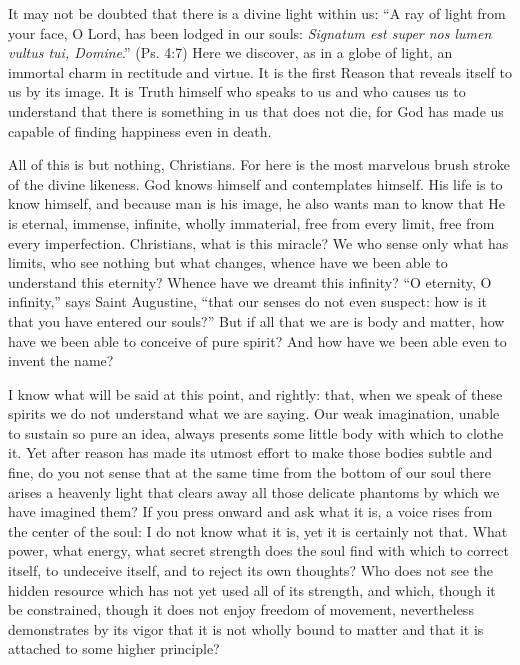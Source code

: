 \documentclass[10pt, twoside]{article}
\begin{document}
It may not be doubted that there is a divine light within us: ``A ray of light from your face, O Lord, has been lodged in our souls: \textit{Signatum est super nos lumen vultus tui, Domine}.'' (Ps. 4:7) Here we discover, as in a globe of light, an immortal charm in rectitude and virtue. It is the first Reason that reveals itself to us by its image. It is Truth himself who speaks to us and who causes us to understand that there is something in us that does not die, for God has made us capable of finding happiness even in death.

All of this is but nothing, Christians. For here is the most marvelous brush stroke of the divine likeness. God knows himself and contemplates himself. His life is to know himself, and because man is his image, he also wants man to know that He is eternal, immense, infinite, wholly immaterial, free from every limit, free from every imperfection. Christians, what is this miracle? We who sense only what has limits, who see nothing but what changes, whence have we been able to understand this eternity? Whence have we dreamt this infinity? ``O eternity, O infinity,'' says Saint Augustine, ``that our senses do not even suspect: how is it that you have entered our souls?'' But if all that we are is body and matter, how have we been able to conceive of pure spirit? And how have we been able even to invent the name?

I know what will be said at this point, and rightly: that, when we speak of these spirits we do not understand what we are saying. Our weak imagination, unable to sustain so pure an idea, always presents some little body with which to clothe it. Yet after reason has made its utmost effort to make those bodies subtle and fine, do you not sense that at the same time from the bottom of our soul there arises a heavenly light that clears away all those delicate phantoms by which we have imagined them? If you press onward and ask what it is, a voice rises from the center of the soul: I do not know what it is, yet it is certainly not that. What power, what energy, what secret strength does the soul find with which to correct itself, to undeceive itself, and to reject its own thoughts? Who does not see the hidden resource which has not yet used all of its strength, and which, though it be constrained, though it does not enjoy freedom of movement, nevertheless demonstrates by its vigor that it is not wholly bound to matter and that it is attached to some higher principle?
\end{document}
